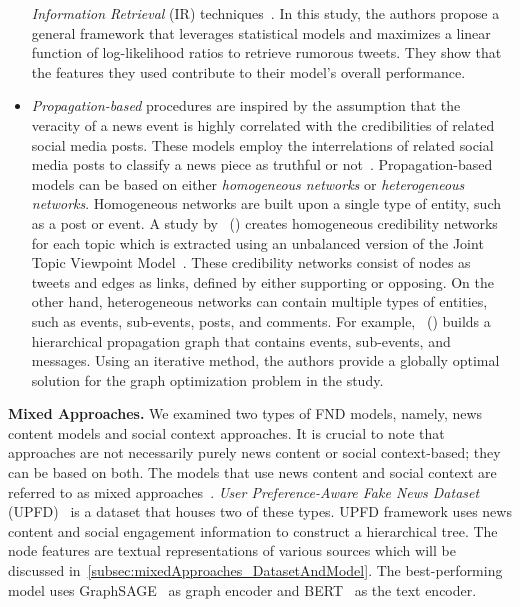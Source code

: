 \begin{itemize}
\emph{Information Retrieval} (IR) techniques~\parencite{RumorHasIt_Qazvinian}.  In this study, the authors propose a general framework that leverages statistical models and maximizes a linear function of log-likelihood ratios to retrieve rumorous tweets. They show that the features they used contribute to their model's overall performance.
    \item \emph{Propagation-based} procedures are inspired by the assumption that the veracity of a news event is highly correlated with the credibilities of related social media posts. These models employ the interrelations of related social media posts to classify a news piece as truthful or not~\parencite{FakeNewsDetectionOnSocialMediaADataMiningPerspective_Shu}. Propagation-based models can be based on either \emph{homogeneous networks} or \emph{heterogeneous networks}. Homogeneous networks are built upon a single type of entity, such as a post or event. A study by~\citeauthor{NewsVerificationByExploitingConflictingSocialViewpoints_Jin} (\citeyear{NewsVerificationByExploitingConflictingSocialViewpoints_Jin}) creates homogeneous credibility networks for each topic which is extracted using an unbalanced version of the Joint Topic Viewpoint Model~\parencite{FindingAndArguingExpressions_Trabelsi}. These credibility networks consist of nodes as tweets and edges as links, defined by either supporting or opposing. On the other hand, heterogeneous networks can contain multiple types of entities, such as events, sub-events, posts, and comments. For example,~\citeauthor{NewsCredibilityEvaluationOnMicroblog_Jin} (\citeyear{NewsCredibilityEvaluationOnMicroblog_Jin}) builds a hierarchical propagation graph that contains events, sub-events, and messages. Using an iterative method, the authors provide a globally optimal solution for the graph optimization problem in the study.\\
\end{itemize}
\textbf{Mixed Approaches.} We examined two types of FND models, namely,  news content models and social context approaches. It is crucial to note that approaches are not necessarily purely news content or social context-based; they can be based on both. The models that use news content and social context are referred to as mixed approaches~\parencite{GraphNeuralNetworksWithContinualLearningFakeNewsDetection_Han}. \emph{User Preference-Aware Fake News Dataset} (UPFD)~\parencite{UPFD_Dataset_Shu} is a dataset that houses two of these types. UPFD framework uses news content and social engagement information to construct a hierarchical tree. The node features are textual representations of various sources which will be discussed in~\ref{subsec:mixedApproaches_DatasetAndModel}. The best-performing model uses GraphSAGE~\parencite{GraphSAGE_Hamilton} as graph encoder and BERT~\parencite{BERT_Devlin} as the text encoder.\\
